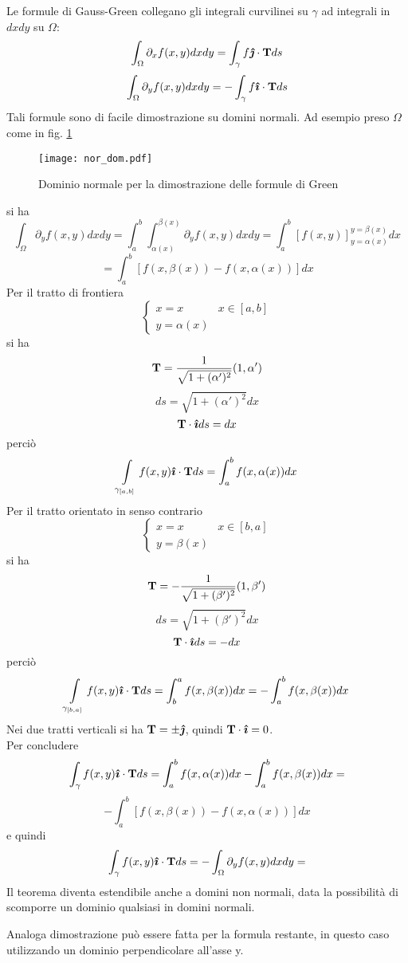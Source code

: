 Le formule di Gauss-Green collegano gli integrali curvilinei su $\gamma$
ad integrali in $dx dy$ su $\Omega$:
\[
	\int_{\Omega}\partial_x f(x,y)dx dy= \int_{\gamma} f \boldsymbol{\hat{\jmath}} \cdot {\bf T} ds
\]
\[
	\int_{\Omega}\partial_y f(x,y)dx dy= - \int_{\gamma} f \boldsymbol{\hat{\imath}} \cdot {\bf T} ds
\]
Tali formule sono di facile dimostrazione su domini normali. Ad esempio
preso $\Omega$ come in fig. \ref{nor_dom}
\begin{figure}[H]
	\centering
	\texttt{[image: nor\_dom.pdf]}
	\caption{Dominio normale per la dimostrazione delle formule di Green}
	\label{nor_dom}
\end{figure}
\noindent
si ha
\[
	\int_{\Omega} \partial_y f (x,y) dx dy=
	\int_a^b \int_{\alpha(x)}^{\beta(x)}
	\partial_y f (x,y) dx dy=
	\int_a^b \left[
		f(x,y)
	\right]_{y=\alpha(x)}^{y=\beta(x)}dx
\]
\[
	= \int_a^b \left[
	f(x,\beta (x)) - f(x, \alpha(x))
	\right] dx
\]
Per il tratto di frontiera
\[
	\left\{ 
	\begin{array}{ll}
		x=x & x \in [a,b] \\
		y= \alpha(x)
	\end{array}
	\right.
\]
si ha
\[
	{\bf T}= \frac{1}{\sqrt{1+ (\alpha ' )^2}}(1,\alpha ')
\]
\[
	ds= \sqrt{1+ (\alpha ' )^2} dx
\]
\[
	{\bf T} \cdot \boldsymbol{\hat{\imath}} ds= dx
\]
perci\`o
\[
	\int \limits_{\gamma_{[a,b]}} f(x,y)\boldsymbol{\hat{\imath}} \cdot {\bf T} ds
	= \int_a^b f(x, \alpha(x)) dx
\]
Per il tratto orientato in senso contrario
\[
	\left\{ 
	\begin{array}{ll}
		x=x & x \in [b,a] \\
		y= \beta(x)
	\end{array}
	\right.
\]
si ha
\[
	{\bf T}= - \frac{1}{\sqrt{1+ (\beta ' )^2}}(1,\beta ')
\]
\[
	ds= \sqrt{1+ (\beta ' )^2} dx
\]
\[
	{\bf T} \cdot \boldsymbol{\hat{\imath}} ds= -dx
\]
perci\`o
\[
	\int \limits_{\gamma_{[b,a]}} f(x,y)\boldsymbol{\hat{\imath}} \cdot {\bf T} ds
	= \int_b^a f(x, \beta(x)) dx
	= -\int_a^b f(x, \beta(x)) dx
\]
Nei due tratti verticali si ha ${\bf T} = \pm \boldsymbol{\hat{\jmath}}$, 
quindi ${\bf T} \cdot \boldsymbol{\hat{\imath}} = 0$.\\
Per concludere
\[
	\int_{\gamma} f(x,y)\boldsymbol{\hat{\imath}} \cdot {\bf T} ds = 
	\int_a^b f(x, \alpha(x)) dx
	- \int_a^b f(x, \beta(x)) dx=
\]
\[
	- \int_a^b \left[ f(x, \beta(x)) -f(x, \alpha(x)) \right] dx
\]
e quindi
\[
	\int_{\gamma} f(x,y)\boldsymbol{\hat{\imath}} \cdot {\bf T} ds =
	- \int_{\Omega} \partial_y f (x,y) dx dy=
\]
Il teorema diventa estendibile anche a domini non normali, data la possibilit\`a di scomporre un dominio qualsiasi in domini normali.

Analoga dimostrazione pu\`o essere fatta per la formula restante, in questo 
caso utilizzando un dominio perpendicolare all'asse y.

